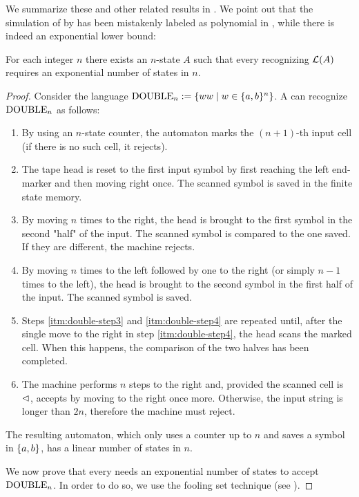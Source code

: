 We summarize these and other related results in .
We point out that the simulation of \OMODLA by \ONFA has been mistakenly labeled as polynomial in \cite{PigPri23a}, while there is indeed an exponential lower bound:
\begin{thrm}\label{thm:OM1DLAto1NFAlower}
	For each integer $n$ there exists an $n$-state \OMODLA $A$ such that every \ONFA recognizing $\mathcal L(A)$ requires an exponential number of states in $n$.
\end{thrm}
\begin{proof}
	Consider the language $\mathrm{DOUBLE}_n:=\{ww\mid w\in\{a,b\}^n\}$.
	A \OMODLA can recognize $\mathrm{DOUBLE}_n$ as follows:
	\begin{enumerate}
		\item By using an $n$-state counter, the automaton marks the $(n+1)$-th input cell (if there is no such cell, it rejects).
		\item The tape head is reset to the first input symbol by first reaching the left end-marker and then moving right once. The scanned symbol is saved in the finite state memory.
		\item\label{itm:double-step3} By moving $n$ times to the right, the head is brought to the first symbol in the second "half" of the input. The scanned symbol is compared to the one saved.
		      If they are different, the machine rejects.
		\item\label{itm:double-step4} By moving $n$ times to the left followed by one to the right (or simply $n-1$ times to the left), the head is brought to the second symbol in the first half of the input. The scanned symbol is saved.
		\item Steps \ref{itm:double-step3} and \ref{itm:double-step4} are repeated until, after the single move to the right in step \ref{itm:double-step4}, the head scans the marked cell. When this happens, the comparison of the two halves has been completed.
		\item The machine performs $n$ steps to the right and, provided the scanned cell is $\lhd$, accepts by moving to the right once more.
		      Otherwise, the input string is longer than $2n$, therefore the machine must reject.
	\end{enumerate}
	The resulting automaton, which only uses a counter up to $n$ and saves a symbol in $\{a,b\}$, has a linear number of states in $n$.

	We now prove that every \ONFA needs an exponential number of states to accept $\mathrm{DOUBLE}_n$.
	In order to do so, we use the fooling set technique (see ).


\end{proof}
